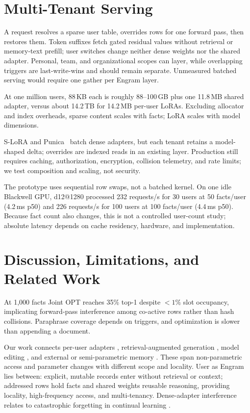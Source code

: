 \documentclass[letterpaper]{article} %
\begin{document}
\section{Multi-Tenant Serving}
\label{sec:serving}

A request resolves a sparse user table, overrides rows for one forward pass,
then restores them. Token suffixes fetch gated residual values without retrieval
or memory-text prefill; user switches change neither dense weights nor the
shared adapter. Personal, team, and organizational scopes can layer, while
overlapping triggers are last-write-wins and should remain separate. Unmeasured
batched serving would require one gather per Engram layer.

At one million users, 88\,KB each is roughly 88--100\,GB plus one 11.8\,MB
shared adapter, versus about 14.2\,TB for 14.2\,MB per-user LoRAs. Excluding
allocator and index overheads, sparse content scales with facts; LoRA scales
with model dimensions.

S-LoRA and Punica~\citep{sheng2024slora,chen2024punica} batch dense adapters,
but each tenant retains a model-shaped delta; overrides are indexed reads in an
existing layer. Production still requires caching, authorization, encryption,
collision telemetry, and rate limits; we test composition and scaling, not
security.

The prototype uses sequential row swaps, not a batched kernel. On one idle
Blackwell GPU, d12@1280 processed 232 requests/s for 30 users at 50 facts/user
(4.2\,ms p50) and 226 requests/s for 100 users at 100 facts/user (4.4\,ms p50).
Because fact count also changes, this is not a controlled user-count study;
absolute latency depends on cache residency, hardware, and implementation.

\section{Discussion, Limitations, and Related Work}
\label{sec:discussion}

At 1,000 facts Joint OPT reaches 35\% top-1 despite ${<}1\%$ slot occupancy,
implicating forward-pass interference among co-active rows rather than hash
collisions. Paraphrase coverage depends on triggers, and optimization is slower
than appending a document.

Our work connects per-user adapters
\citep{houlsby2019adapters,hu2022lora,zhang2024personalization,
su2024prag,tan2024oppu,zhuang2024hydra}, retrieval-augmented generation
\citep{lewis2020rag,gao2023ragsurvey,borgeaud2022retro}, model editing
\citep{meng2022rome,meng2023memit,mitchell2022mend,mitchell2022serac,
wang2024wise}, and external or semi-parametric memory
\citep{lample2019pkm,packer2023memgpt,cheng2026engram}. These span
non-parametric access and parameter changes with different scope and locality.
User as Engram lies between: explicit, mutable records enter without retrieval
or context; addressed rows hold facts and shared weights reusable reasoning,
providing locality, high-frequency access, and multi-tenancy. Dense-adapter
interference relates to catastrophic forgetting in continual learning
\citep{mccloskey1989catastrophic,kirkpatrick2017ewc}.
\end{document}
